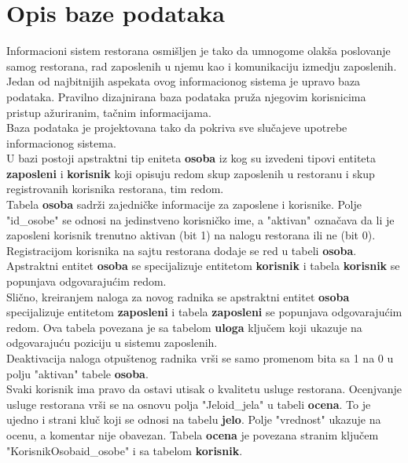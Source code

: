 \newpage
\section{Opis baze podataka}
Informacioni sistem  restorana osmišljen je tako da umnogome olakša poslovanje samog restorana, rad zaposlenih u njemu kao i komunikaciju izmedju zaposlenih. Jedan od najbitnijih aspekata ovog informacionog sistema je upravo baza podataka. Pravilno dizajnirana baza podataka pruža njegovim korisnicima pristup ažuriranim, tačnim informacijama. \\
\indent Baza podataka je projektovana tako da pokriva sve slučajeve upotrebe informacionog sistema. \\
\indent U bazi postoji apstraktni tip eniteta \textbf{osoba} iz kog su izvedeni tipovi entiteta  \textbf{zaposleni} i \textbf{korisnik} koji opisuju redom skup zaposlenih u restoranu i skup registrovanih korisnika restorana, tim redom. \\

Tabela \textbf{osoba} sadrži zajedničke informacije za zaposlene i korisnike. Polje "id\_osobe" se odnosi na jedinstveno korisničko ime, a "aktivan" označava da li je zaposleni korisnik trenutno aktivan (bit 1) na nalogu restorana ili ne (bit 0). \\

\indent Registracijom korisnika na sajtu restorana dodaje se red u tabeli \textbf{oso\-ba}. Apstraktni entitet \textbf{osoba} se specijalizuje entitetom \textbf{korisnik} i tabela \textbf{korisnik} se popunjava odgovarajućim redom. \\

Slično, kreiranjem naloga za novog radnika se apstraktni entitet \textbf{osoba} specijalizuje entitetom \textbf{zaposleni} i tabela \textbf{zaposleni} se popunjava odgovarajućim redom. Ova tabela povezana je sa tabelom \textbf{uloga} ključem koji ukazuje na odgovarajuću poziciju u sistemu zaposlenih.\\

Deaktivacija naloga otpuštenog radnika vrši se samo promenom bita sa 1 na 0 u polju "aktivan" tabele \textbf{osoba}.\\

Svaki korisnik ima pravo da ostavi utisak o kvalitetu usluge restorana. Ocenjvanje usluge restorana vrši se na osnovu polja "Jeloid\_jela" u tabeli \textbf{ocena}. To je ujedno i strani kluč koji se odnosi na tabelu \textbf{jelo}. Polje "vrednost" ukazuje na ocenu, a komentar nije obavezan. Tabela \textbf{ocena} je povezana stranim ključem "KorisnikOsobaid\_osobe" i sa tabelom \textbf{korisnik}. \\

